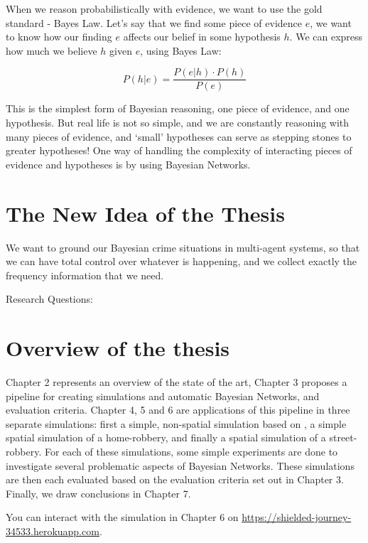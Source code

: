 When we reason probabilistically with evidence, we want to use the gold standard - Bayes Law.
Let's say that we find some piece of evidence $e$, we want to know how our finding $e$ affects our belief in some hypothesis $h$. We can express how much we believe $h$ given $e$, using Bayes Law:

\[ P(h | e) =  \frac{P(e | h) \cdot P(h)}{P(e)}\]


This is the simplest form of Bayesian reasoning, one piece of evidence, and one hypothesis. But real life is not so simple, and we are constantly reasoning with many pieces of evidence, and `small' hypotheses can serve as stepping stones to greater hypotheses! One way of handling the complexity of interacting pieces of evidence and hypotheses is by using Bayesian Networks.

\section{The New Idea of the Thesis}
We want to ground our Bayesian crime situations in multi-agent systems, so that we can have total control over whatever is happening, and we collect exactly the frequency information that we need.

Research Questions:


\section{Overview of the thesis}
Chapter 2 represents an overview of the state of the art, Chapter 3 proposes a pipeline for creating simulations and automatic Bayesian Networks, and evaluation criteria. Chapter 4, 5 and 6 are applications of this pipeline in three separate simulations: first a simple, non-spatial simulation based on \citep{Vlek2015}, a simple spatial simulation of a home-robbery, and finally a spatial simulation of a street-robbery. For each of these simulations, some simple experiments are done to investigate several problematic aspects of Bayesian Networks. These simulations are then each evaluated based on the evaluation criteria set out in Chapter 3. Finally, we draw conclusions in Chapter 7. 

You can interact with the simulation in Chapter 6 on \url{https://shielded-journey-34533.herokuapp.com}.
